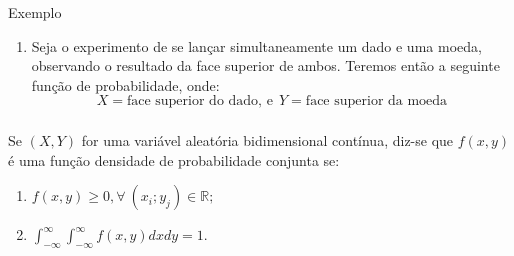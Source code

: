 \documentclass[14pt,aspectratio=1610]{beamer}
\begin{document}
\begin{frame}{}
\frametitle{}
\begin{block}{Exemplo}
\justifying
\begin{enumerate}
\item \justifying Seja o experimento de se lançar simultaneamente um dado e uma moeda, observando o resultado da face superior de ambos. Teremos então a seguinte
função de probabilidade, onde:
$$X= \textrm{face superior do dado,\ e}\ \ Y=\textrm{face superior da moeda}$$
\end{enumerate}
\vspace{-0.8cm}
\begin{table}[h]
\centering
{}
\end{table}
\end{block}
\end{frame}

\begin{frame}{}
\frametitle{}
\begin{block}{}
\justifying
Se $(X, Y )$ for uma variável aleatória bidimensional contínua, diz-se que
$f(x, y)$ é uma função densidade de probabilidade conjunta se:

\begin{enumerate}
\item $f(x, y)\geq 0, \forall\ (x_{i}; y_{j})\in \mathbb{R};$
\item $\displaystyle \int_{-\infty}^{\infty} \int_{-\infty}^{\infty} f(x, y)dxdy = 1.$
\end{enumerate}
\end{block}
\end{frame}
\end{document}
